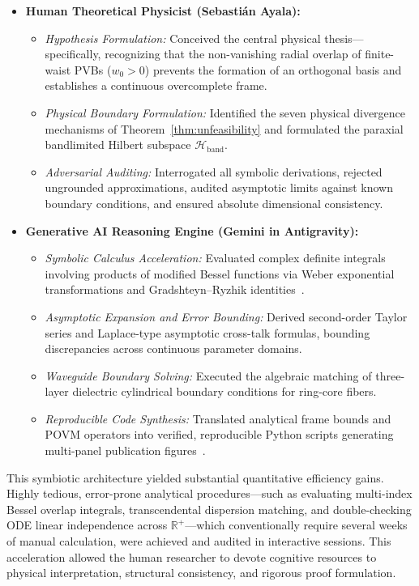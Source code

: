 \documentclass{optica-article}
\begin{document}
\begin{itemize}
    \item \textbf{Human Theoretical Physicist (Sebastián Ayala):}
    \begin{itemize}
        \item \emph{Hypothesis Formulation:} Conceived the central physical thesis---specifically, recognizing that the non-vanishing radial overlap of finite-waist PVBs ($w_0 > 0$) prevents the formation of an orthogonal basis and establishes a continuous overcomplete frame.
        \item \emph{Physical Boundary Formulation:} Identified the seven physical divergence mechanisms of Theorem~\ref{thm:unfeasibility} and formulated the paraxial bandlimited Hilbert subspace $\mathcal{H}_{\text{band}}$.
        \item \emph{Adversarial Auditing:} Interrogated all symbolic derivations, rejected ungrounded approximations, audited asymptotic limits against known boundary conditions, and ensured absolute dimensional consistency.
    \end{itemize}
    \item \textbf{Generative AI Reasoning Engine (Gemini in Antigravity):}
    \begin{itemize}
        \item \emph{Symbolic Calculus Acceleration:} Evaluated complex definite integrals involving products of modified Bessel functions via Weber exponential transformations and Gradshteyn--Ryzhik identities~\cite{Gradshteyn2014}.
        \item \emph{Asymptotic Expansion and Error Bounding:} Derived second-order Taylor series and Laplace-type asymptotic cross-talk formulas, bounding discrepancies across continuous parameter domains.
        \item \emph{Waveguide Boundary Solving:} Executed the algebraic matching of three-layer dielectric cylindrical boundary conditions for ring-core fibers.
        \item \emph{Reproducible Code Synthesis:} Translated analytical frame bounds and POVM operators into verified, reproducible Python scripts generating multi-panel publication figures~\cite{Zhu2026PaperBanana}.
    \end{itemize}
\end{itemize}

This symbiotic architecture yielded substantial quantitative efficiency gains. Highly tedious, error-prone analytical procedures---such as evaluating multi-index Bessel overlap integrals, transcendental dispersion matching, and double-checking ODE linear independence across $\mathbb{R}^+$---which conventionally require several weeks of manual calculation, were achieved and audited in interactive sessions. This acceleration allowed the human researcher to devote cognitive resources to physical interpretation, structural consistency, and rigorous proof formulation.
\end{document}
